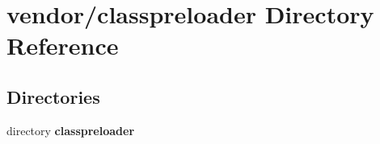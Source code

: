 \section{vendor/classpreloader Directory Reference}
\label{dir_970fef9688f229d8dc7e96e5d5c6f493}
\subsection*{Directories}
\begin{DoxyCompactItemize}
\item 
directory {\bf classpreloader}
\end{DoxyCompactItemize}
